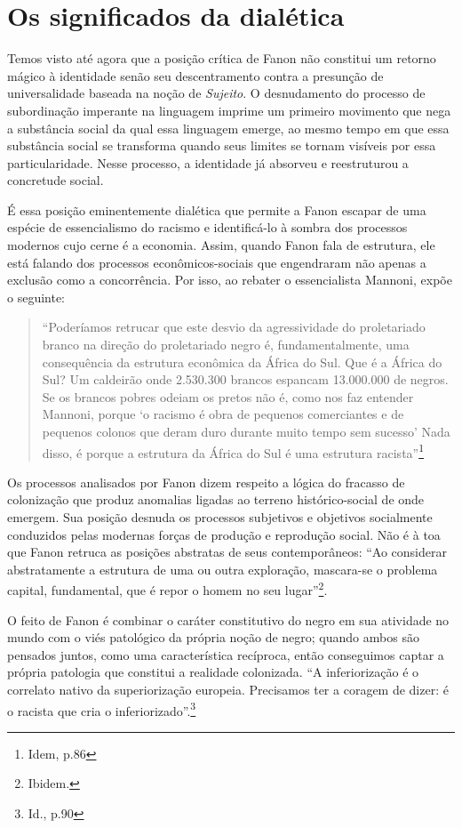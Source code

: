 \chapter{Os significados da dialética}

Temos visto até agora que a posição crítica de Fanon não constitui um
retorno mágico à identidade senão seu descentramento contra a presunção
de universalidade baseada na noção de \emph{Sujeito}. O desnudamento do
processo de subordinação imperante na linguagem imprime um primeiro
movimento que nega a substância social da qual essa linguagem emerge, ao
mesmo tempo em que essa substância social se transforma quando seus
limites se tornam visíveis por essa particularidade. Nesse processo, a
identidade já absorveu e reestruturou a concretude social.

É essa posição eminentemente dialética que permite a Fanon escapar de
uma espécie de essencialismo do racismo e identificá-lo à sombra dos
processos modernos cujo cerne é a economia. Assim, quando Fanon fala de
estrutura, ele está falando dos processos econômicos-sociais que
engendraram não apenas a exclusão como a concorrência. Por isso, ao
rebater o essencialista Mannoni, expõe o seguinte:

\begin{quote}
``Poderíamos retrucar que este desvio da agressividade do proletariado
branco na direção do proletariado negro é, fundamentalmente, uma
consequência da estrutura econômica da África do Sul. Que é a África do
Sul? Um caldeirão onde 2.530.300 brancos espancam 13.000.000 de negros.
Se os brancos pobres odeiam os pretos não é, como nos faz entender
Mannoni, porque `o racismo é obra de pequenos comerciantes e de pequenos
colonos que deram duro durante muito tempo sem sucesso' Nada disso, é
porque a estrutura da África do Sul é uma estrutura racista''\footnote{Idem,
  p.86}
\end{quote}

Os processos analisados por Fanon dizem respeito a lógica do fracasso de
colonização que produz anomalias ligadas ao terreno histórico-social de
onde emergem. Sua posição desnuda os processos subjetivos e objetivos
socialmente conduzidos pelas modernas forças de produção e reprodução
social. Não é à toa que Fanon retruca as posições abstratas de seus
contemporâneos: ``Ao considerar abstratamente a estrutura de uma ou
outra exploração, mascara-se o problema capital, fundamental, que é
repor o homem no seu lugar''\footnote{Ibidem.}.

O feito de Fanon é combinar o caráter constitutivo do negro em sua
atividade no mundo com o viés patológico da própria noção de negro;
quando ambos são pensados juntos, como uma característica recíproca,
então conseguimos captar a própria patologia que constitui a realidade
colonizada. ``A inferiorização é o correlato nativo da superiorização
europeia. Precisamos ter a coragem de dizer: é o racista que cria o
inferiorizado''.\footnote{Id., p.90}

